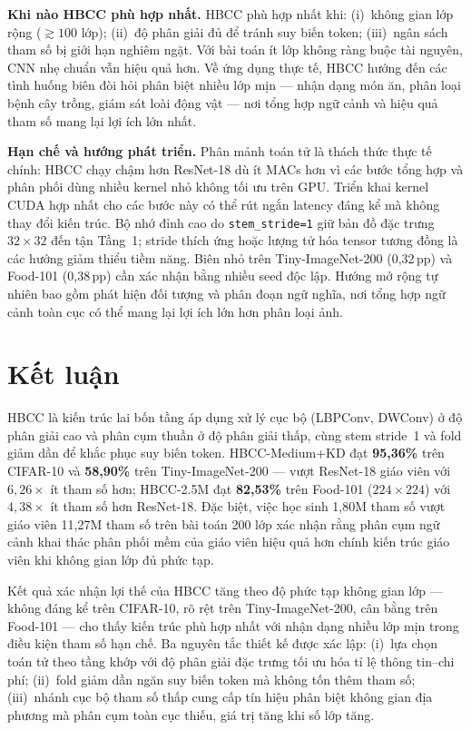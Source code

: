 \documentclass[conference]{IEEEtran}
\begin{document}
\textbf{Khi nào HBCC phù hợp nhất.}
HBCC phù hợp nhất khi: (i)~không gian lớp rộng ($\gtrsim\!100$ lớp);
(ii)~độ phân giải đủ để tránh suy biến token;
(iii)~ngân sách tham số bị giới hạn nghiêm ngặt.
Với bài toán ít lớp không ràng buộc tài nguyên, CNN nhẹ chuẩn vẫn hiệu
quả hơn. Về ứng dụng thực tế, HBCC hướng đến các tình huống biên đòi
hỏi phân biệt nhiều lớp mịn --- nhận dạng món ăn, phân loại bệnh cây
trồng, giám sát loài động vật --- nơi tổng hợp ngữ cảnh và hiệu quả
tham số mang lại lợi ích lớn nhất.

\textbf{Hạn chế và hướng phát triển.}
Phân mảnh toán tử là thách thức thực tế chính: HBCC chạy chậm hơn
ResNet-18 dù ít MACs hơn vì các bước tổng hợp và phân phối dùng nhiều
kernel nhỏ không tối ưu trên GPU. Triển khai kernel CUDA hợp nhất
cho các bước này có thể rút ngắn latency đáng kể mà không thay đổi
kiến trúc. Bộ nhớ đỉnh cao do \texttt{stem\_stride=1} giữ bản đồ
đặc trưng $32\!\times\!32$ đến tận Tầng~1; stride thích ứng hoặc lượng
tử hóa tensor tương đồng là các hướng giảm thiểu tiềm năng. Biên nhỏ
trên Tiny-ImageNet-200 (0,32\,pp) và Food-101 (0,38\,pp) cần xác nhận
bằng nhiều seed độc lập. Hướng mở rộng tự nhiên bao gồm phát hiện đối
tượng và phân đoạn ngữ nghĩa, nơi tổng hợp ngữ cảnh toàn cục có thể
mang lại lợi ích lớn hơn phân loại ảnh.

\section{Kết luận}
\label{sec:conclusion}

HBCC là kiến trúc lai bốn tầng áp dụng xử lý cục bộ (LBPConv,
DWConv) ở độ phân giải cao và phân cụm thuần ở độ phân giải thấp,
cùng stem stride~1 và fold giảm dần để khắc phục suy biến token.
HBCC-Medium+KD đạt \textbf{95,36\%} trên CIFAR-10 và \textbf{58,90\%}
trên Tiny-ImageNet-200 --- vượt ResNet-18 giáo viên với $6{,}26\!\times$
ít tham số hơn; HBCC-2.5M đạt \textbf{82,53\%} trên Food-101
($224\!\times\!224$) với $4{,}38\!\times$ ít tham số hơn ResNet-18.
Đặc biệt, việc học sinh 1,80M tham số vượt giáo viên 11,27M tham số
trên bài toán 200 lớp xác nhận rằng phân cụm ngữ cảnh khai thác
phân phối mềm của giáo viên hiệu quả hơn chính kiến trúc giáo viên
khi không gian lớp đủ phức tạp.

Kết quả xác nhận lợi thế của HBCC tăng theo độ phức tạp không gian
lớp --- không đáng kể trên CIFAR-10, rõ rệt trên Tiny-ImageNet-200,
cân bằng trên Food-101 --- cho thấy kiến trúc phù hợp nhất với nhận
dạng nhiều lớp mịn trong điều kiện tham số hạn chế. Ba nguyên tắc
thiết kế được xác lập: (i)~lựa chọn toán tử theo tầng khớp với độ
phân giải đặc trưng tối ưu hóa tỉ lệ thông tin--chi phí;
(ii)~fold giảm dần ngăn suy biến token mà không tốn thêm tham số;
(iii)~nhánh cục bộ tham số thấp cung cấp tín hiệu phân biệt không
gian địa phương mà phân cụm toàn cục thiếu, giá trị tăng khi số
lớp tăng.
\end{document}
